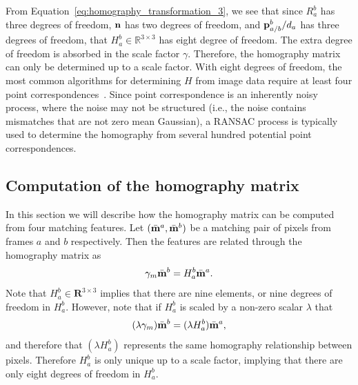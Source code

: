 From Equation~\eqref{eq:homography_transformation_3}, we see that since $R_a^b$ has three degrees of freedom, $\mathbf{n}$ has two degrees of freedom, and $\mathbf{p}_{a/b}^b/d_a$ has three degrees of freedom, that $H_a^b\in\mathbb{R}^{3\times 3}$ has eight degree of freedom.  The extra degree of freedom is absorbed in the scale factor $\gamma$.  Therefore,  the homography matrix can only be determined up to a scale factor.  With eight degrees of freedom, the most common algorithms for determining $H$ from image data require at least four point correspondences~\cite{HartleyZisserman03}.  Since point correspondence is an inherently noisy process, where the noise may not be structured (i.e., the noise contains mismatches that are not zero mean Gaussian), a RANSAC process is typically used to determine the homography from several hundred potential point correspondences.  

\subsection{Computation of the homography matrix}

In this section we will describe how the homography matrix can be computed from four matching features.  Let $(\bar{\mathbf{m}}^a, \bar{\mathbf{m}}^b)$ be a matching pair of pixels from frames $a$ and $b$ respectively.  Then the features are related through the homography matrix as
\[
\gamma_m \bar{\mathbf{m}}^b = H_a^b \bar{\mathbf{m}}^a.
\]
Note that $H_a^b \in \mathbf{R}^{3\times 3}$ implies that there are nine elements, or nine degrees of freedom in $H_a^b$.  However, note that if $H_a^b$ is scaled by a non-zero scalar $\lambda$ that
\[
(\lambda\gamma_m) \bar{\mathbf{m}}^b = (\lambda H_a^b) \bar{\mathbf{m}}^a,
\]
and therefore that $(\lambda H_a^b)$ represents the same homography relationship between pixels.  Therefore $H_a^b$ is only unique up to a scale factor, implying that there are only eight degrees of freedom in $H_a^b$.

